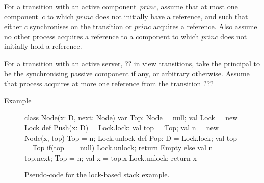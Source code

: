 
For a transition with an active component~$princ$, assume that at most one
component~$c$ to which $princ$ does not initially have a reference, and such
that either $c$ synchronises on the transition or $princ$ acquires a
reference.
%
Also assume no other process acquires a reference to a component to which
$princ$ does not initially hold a reference.  

For a transition with an active server, ?? in view transitions, take the
principal to be the synchronising passive component if any, or arbitrary
otherwise.  Assume that process acquires at more one reference from the
transition ??? 


Example

\begin{figure}
\begin{scala}
class Node(x: D, next: Node)
var Top: Node = null; val Lock = new Lock
def Push(x: D) = {
  Lock.lock; val top = Top; val n = new Node(x, top)
  Top = n; Lock.unlock
}
def Pop: D = {
  Lock.lock; val top = Top
  if(top == null){ Lock.unlock; return Empty }
  else{ val n = top.next; Top = n; val x = top.x
        Lock.unlock; return x }
}
\end{scala}
\caption{Pseudo-code for the lock-based stack example.}
\label{fig:lock-based-stack-pseudocode}
\end{figure}


